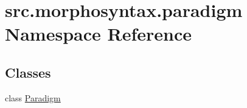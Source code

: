 \hypertarget{namespacesrc_1_1morphosyntax_1_1paradigm}{\section{src.\+morphosyntax.\+paradigm Namespace Reference}
\label{namespacesrc_1_1morphosyntax_1_1paradigm}
}
\subsection*{Classes}
\begin{DoxyCompactItemize}
\item 
class \hyperlink{classsrc_1_1morphosyntax_1_1paradigm_1_1_paradigm}{Paradigm}
\end{DoxyCompactItemize}

